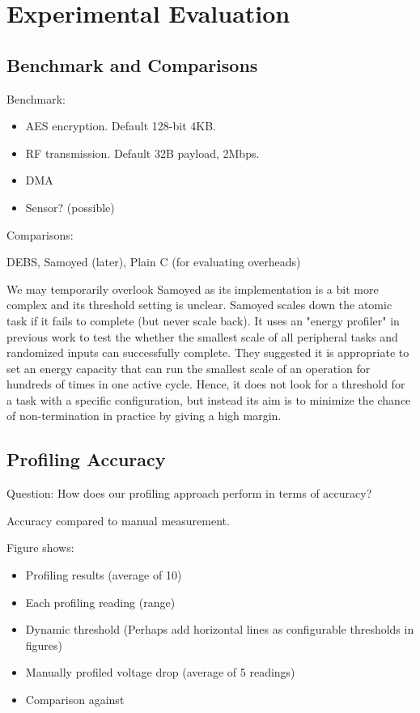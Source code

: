 \section{Experimental Evaluation} \label{sec:experiment}

\subsection{Benchmark and Comparisons}

Benchmark: 

\begin{itemize}
    \item AES encryption. Default 128-bit 4KB.
    \item RF transmission. Default 32B payload, 2Mbps.
    \item DMA
    \item Sensor? (possible)
\end{itemize}

Comparisons:

DEBS, Samoyed (later), Plain C (for evaluating overheads)

We may temporarily overlook Samoyed as its implementation is a bit more complex and its threshold setting is unclear. 
Samoyed scales down the atomic task if it fails to complete (but never scale back). 
It uses an "energy profiler" in previous work to test the whether the smallest scale of all peripheral tasks and randomized inputs can successfully complete. 
They suggested it is appropriate to set an energy capacity that can run the smallest scale of an operation for hundreds of times in one active cycle. 
Hence, it does not look for a threshold for a task with a specific configuration, but instead its aim is to minimize the chance of non-termination in practice by giving a high margin.

\subsection{Profiling Accuracy}

Question: How does our profiling approach perform in terms of accuracy?

Accuracy compared to manual measurement.

Figure shows:
\begin{itemize}
    \item Profiling results (average of 10)
    \item Each profiling reading (range)
    \item Dynamic threshold (Perhaps add horizontal lines as configurable thresholds in figures)
    \item Manually profiled voltage drop (average of 5 readings)
    \item Comparison against
\end{itemize}

